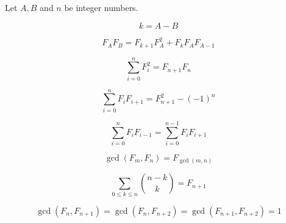 Let $A, B$ and $n$ be integer numbers.

\[
k = A - B
\]

\[
F_A F_B = F_{k+1} F_A^2 + F_k F_A F_{A-1}
\]

\[
\sum_{i=0}^{n} F_i^2 = F_{n+1} F_n
\]

\[
\sum_{i=0}^{n} F_i F_{i+1} = F_{n+1}^2 - (-1)^n
\]

\[
\sum_{i=0}^{n} F_i F_{i-1} = \sum_{i=0}^{n-1} F_i F_{i+1}
\]

\[
\gcd(F_m, F_n) = F_{\gcd(m,n)}
\]

\[
\sum_{0 \le k \le n} \binom{n-k}{k} = F_{n+1}
\]

\[
\gcd(F_n, F_{n+1}) = \gcd(F_n, F_{n+2})
= \gcd(F_{n+1}, F_{n+2}) = 1
\]
